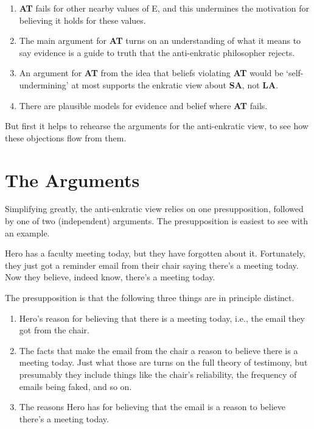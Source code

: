 \documentclass[
  11pt,
  letterpaper,
  DIV=11,
  numbers=noendperiod,
  twoside]{scrartcl}
\providecommand{\tightlist}{%
  \setlength{\itemsep}{0pt}\setlength{\parskip}{0pt}}
\begin{document}
\begin{enumerate}
\def\labelenumi{\arabic{enumi}.}
\tightlist
\item
  \textbf{AT} fails for other nearby values of E, and this undermines
  the motivation for believing it holds for these values.
\item
  The main argument for \textbf{AT} turns on an understanding of what it
  means to say evidence is a guide to truth that the anti-enkratic
  philosopher rejects.
\item
  An argument for \textbf{AT} from the idea that beliefs violating
  \textbf{AT} would be `self-undermining' at most supports the enkratic
  view about \textbf{SA}, not \textbf{LA}.
\item
  There are plausible models for evidence and belief where \textbf{AT}
  fails.
\end{enumerate}

But first it helps to rehearse the arguments for the anti-enkratic view,
to see how these objections flow from them.

\section{The Arguments}\label{sec-arguments}

Simplifying greatly, the anti-enkratic view relies on one
presupposition, followed by one of two (independent) arguments. The
presupposition is easiest to see with an example.

Hero has a faculty meeting today, but they have forgotten about it.
Fortunately, they just got a reminder email from their chair saying
there's a meeting today. Now they believe, indeed know, there's a
meeting today.

The presupposition is that the following three things are in principle
distinct.

\begin{enumerate}
\def\labelenumi{\arabic{enumi}.}
\tightlist
\item
  Hero's reason for believing that there is a meeting today, i.e., the
  email they got from the chair.
\item
  The facts that make the email from the chair a reason to believe there
  is a meeting today. Just what those are turns on the full theory of
  testimony, but presumably they include things like the chair's
  reliability, the frequency of emails being faked, and so on.
\item
  The reasons Hero has for believing that the email is a reason to
  believe there's a meeting today.
\end{enumerate}
\end{document}
